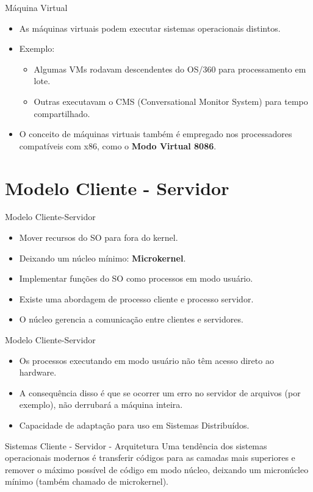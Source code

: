 \documentclass{beamer}
\begin{document}
\begin{frame}{Máquina Virtual}
    \begin{itemize}
        \item As máquinas virtuais podem executar sistemas operacionais distintos.
        \item Exemplo:
              \begin{itemize}
                  \item Algumas VMs rodavam descendentes do OS/360 para processamento em lote.
                  \item Outras executavam o CMS (Conversational Monitor System) para tempo compartilhado.
              \end{itemize}
        \item O conceito de máquinas virtuais também é empregado nos processadores compatíveis com x86, como o \textbf{Modo Virtual 8086}.
    \end{itemize}
\end{frame}


\section{Modelo Cliente - Servidor}
\begin{frame}{Modelo Cliente-Servidor}
    \begin{itemize}
        \item Mover recursos do SO para fora do kernel.
        \item Deixando um núcleo mínimo: \textbf{Microkernel}.
        \item Implementar funções do SO como processos em modo usuário.
        \item Existe uma abordagem de processo cliente e processo servidor.
        \item O núcleo gerencia a comunicação entre clientes e servidores.
    \end{itemize}
\end{frame}
\begin{frame}{Modelo Cliente-Servidor}
    \begin{itemize}
        \item Os processos executando em modo usuário não têm acesso direto ao hardware.
        \item A consequência disso é que se ocorrer um erro no servidor de arquivos (por exemplo), não derrubará a máquina inteira.
        \item Capacidade de adaptação para uso em Sistemas Distribuídos.
    \end{itemize}
\end{frame}
\begin{frame}{Sistemas Cliente - Servidor - Arquitetura }
    Uma tendência dos sistemas operacionais modernos é transferir códigos para as camadas mais superiores e remover o máximo possível de código em modo núcleo, deixando um micronúcleo mínimo (também chamado de microkernel).
\end{frame}
\end{document}
